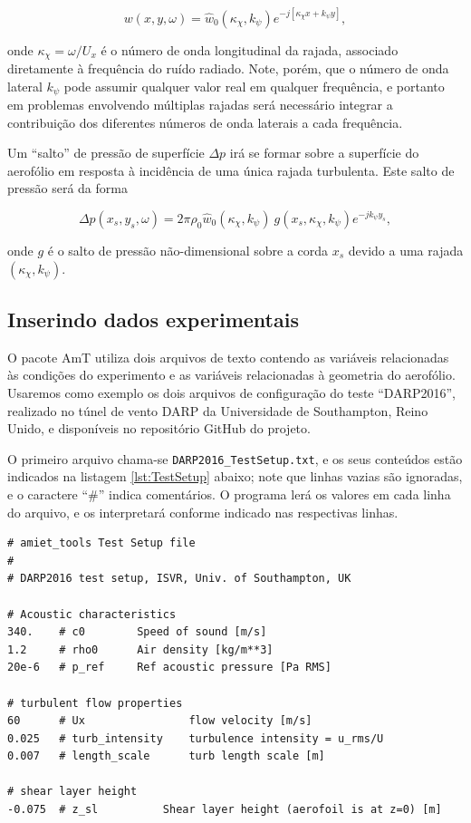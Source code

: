 \documentclass[a4paper, 11pt, twoside]{article}
\begin{document}
\begin{equation}
w(x, y, \omega) = \hat{w}_0(\kappa_\chi, k_\psi) e^{-j \left[ \kappa_\chi x + k_\psi y \right]},
\end{equation}

\noindent onde $\kappa_\chi = \omega/U_x$ é o número de onda longitudinal da rajada, associado diretamente à frequência do ruído radiado. Note, porém, que o número de onda lateral $k_\psi$ pode assumir qualquer valor real em qualquer frequência, e portanto em problemas envolvendo múltiplas rajadas será necessário integrar a contribuição dos diferentes números de onda laterais a cada frequência.

Um ``salto'' de pressão de superfície $\Delta p$ irá se formar sobre a superfície do aerofólio em resposta à incidência de uma única rajada turbulenta. Este salto de pressão será da forma

\begin{equation}
\Delta p(x_s, y_s, \omega) =  2 \pi \rho_0 \hat{w}_0(\kappa_\chi, k_\psi) \ g(x_s, \kappa_\chi, k_\psi) e^{-j k_\psi y_s},
\label{eq:DeltaP_SingleGust}
\end{equation}

\noindent onde $g$ é o salto de pressão não-dimensional sobre a corda $x_s$ devido a uma rajada $(\kappa_\chi, k_\psi)$.


\subsection{Inserindo dados experimentais}

O pacote AmT utiliza dois arquivos de texto contendo as variáveis relacionadas às condições do experimento e as variáveis relacionadas à geometria do aerofólio. Usaremos como exemplo os dois arquivos de configuração do teste ``DARP2016'', realizado no túnel de vento DARP da Universidade de Southampton, Reino Unido, e disponíveis no repositório GitHub do projeto.

O primeiro arquivo chama-se \verb|DARP2016_TestSetup.txt|, e os seus conteúdos estão indicados na listagem \ref{lst:TestSetup} abaixo; note que linhas vazias são ignoradas, e o caractere ``\#'' indica comentários. O programa lerá os valores em cada linha do arquivo, e os interpretará conforme indicado nas respectivas linhas.

\begin{lstlisting}[caption={Arquivo \texttt{DARP2016\_TestSetup.txt}}, label={lst:TestSetup}]
# amiet_tools Test Setup file
#
# DARP2016 test setup, ISVR, Univ. of Southampton, UK

# Acoustic characteristics
340.	# c0		Speed of sound [m/s]
1.2		# rho0		Air density [kg/m**3]
20e-6	# p_ref		Ref acoustic pressure [Pa RMS]

# turbulent flow properties
60		# Ux				flow velocity [m/s]
0.025	# turb_intensity	turbulence intensity = u_rms/U
0.007	# length_scale		turb length scale [m]

# shear layer height
-0.075	# z_sl			Shear layer height (aerofoil is at z=0) [m]
\end{lstlisting}
\end{document}
